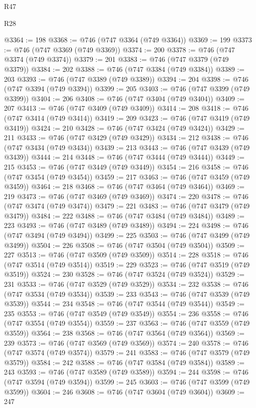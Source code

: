 \begin{lexlean}{R47}
\begin{lexlean}{R28}
\begin{coremodule}
{{{{{{{{{{{{{{{{{{{{{{{{{{{{{{{{{{{{{{{{{{{{{{{{{{{{{{{{{{{{{{{{{{{{{{{{{{{{{{{{{{{{{{{{{{{{{{{{{{{{{{{{{{{{{{{{{{{{{{{{{{{{{{{{{{{{{@3364 := 198
@3368 := @746 (@747 @3364 (@749 @3364))
@3369 := 199
@3373 := @746 (@747 @3369 (@749 @3369))
@3374 := 200
@3378 := @746 (@747 @3374 (@749 @3374))
@3379 := 201
@3383 := @746 (@747 @3379 (@749 @3379))
@3384 := 202
@3388 := @746 (@747 @3384 (@749 @3384))
@3389 := 203
@3393 := @746 (@747 @3389 (@749 @3389))
@3394 := 204
@3398 := @746 (@747 @3394 (@749 @3394))
@3399 := 205
@3403 := @746 (@747 @3399 (@749 @3399))
@3404 := 206
@3408 := @746 (@747 @3404 (@749 @3404))
@3409 := 207
@3413 := @746 (@747 @3409 (@749 @3409))
@3414 := 208
@3418 := @746 (@747 @3414 (@749 @3414))
@3419 := 209
@3423 := @746 (@747 @3419 (@749 @3419))
@3424 := 210
@3428 := @746 (@747 @3424 (@749 @3424))
@3429 := 211
@3433 := @746 (@747 @3429 (@749 @3429))
@3434 := 212
@3438 := @746 (@747 @3434 (@749 @3434))
@3439 := 213
@3443 := @746 (@747 @3439 (@749 @3439))
@3444 := 214
@3448 := @746 (@747 @3444 (@749 @3444))
@3449 := 215
@3453 := @746 (@747 @3449 (@749 @3449))
@3454 := 216
@3458 := @746 (@747 @3454 (@749 @3454))
@3459 := 217
@3463 := @746 (@747 @3459 (@749 @3459))
@3464 := 218
@3468 := @746 (@747 @3464 (@749 @3464))
@3469 := 219
@3473 := @746 (@747 @3469 (@749 @3469))
@3474 := 220
@3478 := @746 (@747 @3474 (@749 @3474))
@3479 := 221
@3483 := @746 (@747 @3479 (@749 @3479))
@3484 := 222
@3488 := @746 (@747 @3484 (@749 @3484))
@3489 := 223
@3493 := @746 (@747 @3489 (@749 @3489))
@3494 := 224
@3498 := @746 (@747 @3494 (@749 @3494))
@3499 := 225
@3503 := @746 (@747 @3499 (@749 @3499))
@3504 := 226
@3508 := @746 (@747 @3504 (@749 @3504))
@3509 := 227
@3513 := @746 (@747 @3509 (@749 @3509))
@3514 := 228
@3518 := @746 (@747 @3514 (@749 @3514))
@3519 := 229
@3523 := @746 (@747 @3519 (@749 @3519))
@3524 := 230
@3528 := @746 (@747 @3524 (@749 @3524))
@3529 := 231
@3533 := @746 (@747 @3529 (@749 @3529))
@3534 := 232
@3538 := @746 (@747 @3534 (@749 @3534))
@3539 := 233
@3543 := @746 (@747 @3539 (@749 @3539))
@3544 := 234
@3548 := @746 (@747 @3544 (@749 @3544))
@3549 := 235
@3553 := @746 (@747 @3549 (@749 @3549))
@3554 := 236
@3558 := @746 (@747 @3554 (@749 @3554))
@3559 := 237
@3563 := @746 (@747 @3559 (@749 @3559))
@3564 := 238
@3568 := @746 (@747 @3564 (@749 @3564))
@3569 := 239
@3573 := @746 (@747 @3569 (@749 @3569))
@3574 := 240
@3578 := @746 (@747 @3574 (@749 @3574))
@3579 := 241
@3583 := @746 (@747 @3579 (@749 @3579))
@3584 := 242
@3588 := @746 (@747 @3584 (@749 @3584))
@3589 := 243
@3593 := @746 (@747 @3589 (@749 @3589))
@3594 := 244
@3598 := @746 (@747 @3594 (@749 @3594))
@3599 := 245
@3603 := @746 (@747 @3599 (@749 @3599))
@3604 := 246
@3608 := @746 (@747 @3604 (@749 @3604))
@3609 := 247
}}}}}}}}}}}}}}}}}}}}}}}}}}}}}}}}}}}}}}}}}}}}}}}}}}}}}}}}}}}}}}}}}}}}}}}}}}}}}}}}}}}}}}}}}}}}}}}}}}}}}}}}}}}}}}}}}}}}}}}}}}}}}}}}}}}}}
\end{coremodule}
\end{lexlean}
\end{lexlean}
